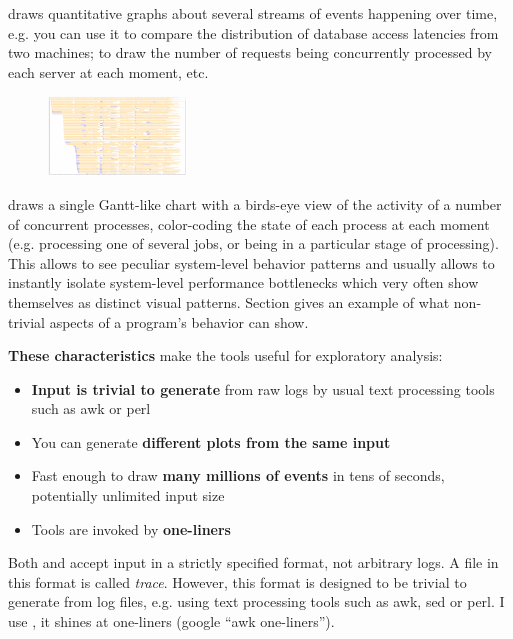 \documentclass{article}
\begin{document}
\timeplot{} draws quantitative graphs about several streams of events happening over time, e.g. you can use it to compare the distribution of database access latencies from two machines; to draw the number of requests being concurrently processed by each server at each moment, etc.

\begin{figure}
\vspace{-5pt}
\center
\includegraphics[height=60pt]{pics/splot/splot-main-example.png}
\end{figure}
\splot{} draws a single Gantt-like chart with a birds-eye view of the activity of a number of concurrent processes, color-coding the state of each process at each moment (e.g. processing one of several jobs, or being in a particular stage of processing). This allows to see peculiar system-level behavior patterns and usually allows to instantly isolate system-level performance bottlenecks which very often show themselves as distinct visual patterns. Section  gives an example of what non-trivial aspects of a program's behavior \splot{} can show.

\textbf{These characteristics} make the tools useful for exploratory analysis:

\begin{itemize}
\item \textbf{Input is trivial to generate} from raw logs by usual text processing tools such as awk or perl
\item You can generate \textbf{different plots from the same input}
\item Fast enough to draw \textbf{many millions of events} in tens of seconds, potentially unlimited input size
\item Tools are invoked by \textbf{one-liners}
\end{itemize} 

Both \timeplot{} and \splot{} accept input in a strictly specified format, not arbitrary logs. A file in this format is called \emph{trace}. However, this format is designed to be trivial to generate from log files, e.g. using text processing tools such as awk, sed or perl. I use \awk{}, it shines at one-liners (google ``awk one-liners'').
\end{document}
